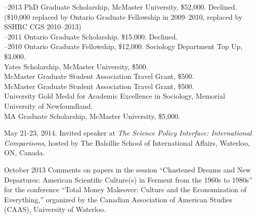 \documentclass[11pt,usenames,dvipsnames]{article}
\begin{document}
–2013 PhD Graduate Scholarship, McMaster University, \$52,000. Declined. (\$10,000 replaced by Ontario Graduate Fellowship in 2009–2010, replaced by SSHRC CGS 2010–2013)\\

–2011 Ontario Graduate Scholarship, \$15,000. Declined.\\

–2010 Ontario Graduate Fellowship, \$12,000. Sociology Department Top Up, \$3,000.\\

 Yates Scholarship, McMaster University, \$500.\\

 McMaster Graduate Student Association Travel Grant, \$500.\\

 McMaster Graduate Student Association Travel Grant, \$500.\\

 University Gold Medal for Academic Excellence in Sociology, Memorial University of Newfoundland.\\

 MA Graduate Scholarship, McMaster University, \$5,000.\\





\ind May 21-23, 2014. Invited speaker at \emph{The Science Policy Interface: International Comparisons}, hosted by The Balsillie School of International Affairs, Waterloo, ON, Canada. \\


\ind October 2013 Comments on papers in the session ``Chastened Dreams and New Departures: American Scientific Culture(s) in Ferment from the 1960s to 1980s'' for the conference ``Total Money Makeover: Culture and the Economization of Everything,'' organized by the Canadian Association of American Studies (CAAS), University of Waterloo. \\
\end{document}
